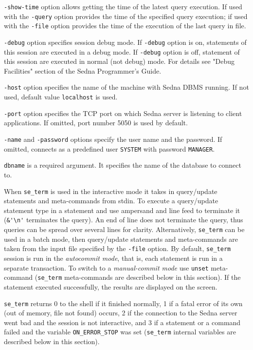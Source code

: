\documentclass[a4paper,12pt]{article}
\begin{document}
\verb!-show-time! option allows getting the time of the latest query execution.
If used with the \verb!-query! option provides the time of the specified query
execution; if used with the \verb!-file! option provides the time of the
execution of the last query in file.

\verb!-debug! option specifies session debug mode. If \verb!-debug! option is
on, statements of this session are executed in a debug mode. If \verb!-debug!
option is off, statement of this session are executed in normal (not debug)
mode. For details see "Debug Facilities" section of the Sedna Programmer's
Guide.

\verb!-host! option specifies the name of the machine with Sedna DBMS running.
If not used, default value \verb!localhost! is used.

\verb!-port! option specifies the TCP port on which Sedna server is listening to
client applications. If omitted, port number 5050 is used by default.

\verb!-name! and \verb!-password! options specify the user name and the
password. If omitted, connects as a predefined user \verb!SYSTEM! with password
\verb!MANAGER!.

\verb!dbname! is a required argument. It specifies the name of the database to
connect to.

When \verb!se_term! is used in the interactive mode it takes in query/update
statements and meta-commands from stdin. To execute a query/update statement
type in a statement and use ampersand and line feed to terminate it
(\verb!&'\n'! terminates the query). An end of line does not terminate the
query, thus queries can be spread over several lines for clarity. Alternatively,
\verb!se_term! can be used in a batch mode, then query/update statements and
meta-commands are taken from the input file specified by the \verb!-file!
option. By default, \verb!se_term! session is run in the \emph{autocommit mode},
that is, each statement is run in a separate transaction. To switch to a
\emph{manual-commit mode} use \verb!unset! meta-command (\verb!se_term!
meta-commands are described below in this section). If the statement executed
successfully, the results are displayed on the screen.

\verb!se_term! returns 0 to the shell if it finished normally, 1 if a fatal
error of its own (out of memory, file not found) occurs, 2 if the connection to
the Sedna server went bad and the session is not interactive, and 3 if a
statement or a command failed and the variable \verb!ON_ERROR_STOP! was set
(\verb!se_term! internal variables are described below in this section).
\end{document}
